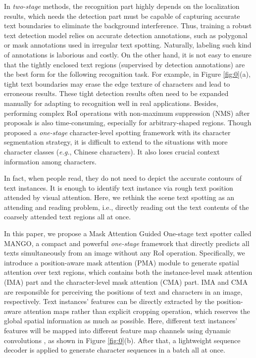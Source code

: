 \documentclass[letterpaper]{article} \usepackage{aaai21}  \usepackage{times}  \usepackage{helvet} \usepackage{courier}  \usepackage[hyphens]{url}  \usepackage{graphicx} \urlstyle{rm} \def\UrlFont{\rm}  \usepackage{natbib}  \usepackage{caption} \frenchspacing  \setlength{\pdfpagewidth}{8.5in}  \setlength{\pdfpageheight}{11in}  \usepackage{multirow}
\begin{document}
In \emph{two-stage} methods, the recognition part highly depends on the localization results, which needs the detection part must be capable of capturing accurate text boundaries to eliminate the background interference.
Thus, training a robust text detection model relies on accurate detection annotations, such as polygonal or mask annotations used in irregular text spotting.
Naturally, labeling such kind of annotations is laborious and costly.
On the other hand, it is not easy to ensure that the tightly enclosed text regions (supervised by detection annotations) are the best form for the following recognition task. For example, in Figure \ref{fig:0}(a), tight text boundaries may erase the edge texture of characters and lead to erroneous results.
These tight detection results often need to be expanded manually for adapting to recognition well in real applications.
Besides, performing complex RoI operations with non-maximum suppression (NMS) after proposals is also time-consuming, especially for arbitrary-shaped regions.
Though \cite{xing2019convolutional} proposed a \emph{one-stage} character-level spotting framework with its character segmentation strategy,
it is difficult to extend to the situations with more character classes (\emph{e.g.}, Chinese characters). It also loses crucial context information among  characters.

In fact, when people read, they do not need to depict the accurate contours of text instances. It is enough to identify text instance via rough text position attended by visual attention.
Here, we rethink the scene text spotting as an attending and reading problem, i.e., directly reading out the text contents of the coarsely attended text regions all at once.

In this paper, we propose a Mask Attention Guided One-stage text spotter called MANGO, a compact and powerful \emph{one-stage} framework that directly predicts all texts simultaneously from an image without any RoI operation.
Specifically, we introduce a position-aware mask attention (PMA) module to generate spatial attention over text regions, which contains both the instance-level mask attention (IMA) part and the character-level mask attention (CMA) part.
IMA and CMA are responsible for perceiving the positions of text and characters in an image, respectively.
Text instances' features can be directly extracted by the position-aware attention maps rather than explicit cropping operation, which reserves the global spatial information as much as possible.
Here, different text instances' features will be mapped into different feature map channels using dynamic convolutions \cite{wang2020solov2}, as shown in Figure \ref{fig:0}(b).
After that, a lightweight sequence decoder is applied to generate character sequences in a batch all at once.
\end{document}
